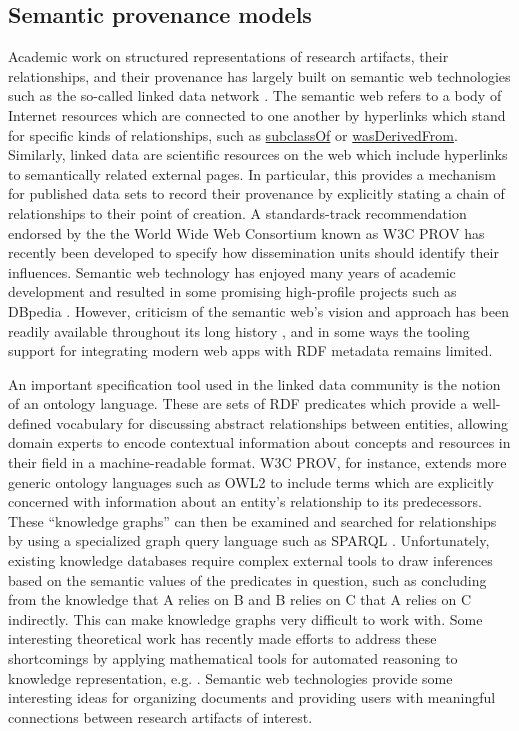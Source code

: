 \documentclass[../thesis]{subfiles}
\begin{document}
\subsection{Semantic provenance models}
Academic work on structured representations of research artifacts,
their relationships, and their provenance has largely built on
semantic web technologies such as the so-called linked data network
\cite{LinkedData}. The semantic web refers to a body
of Internet resources which are connected to one another by hyperlinks
which stand for specific kinds of relationships, such as
\href{https://www.w3.org/TR/2004/REC-rdf-schema-20040210/#ch_subclassof}{subclassOf}
or \href{https://www.w3.org/TR/2013/REC-prov-dm-20130430/#dfn-wasderivedfrom}{wasDerivedFrom}.
Similarly, linked data are scientific resources on the
web which include hyperlinks to semantically related external pages. In
particular, this provides a mechanism for published data sets to
record their provenance by explicitly stating a chain of relationships
to their point of creation. A standards-track recommendation endorsed
by the the World Wide Web Consortium known as W3C PROV \cite{PROV} has
recently been developed to specify how dissemination units should
identify their influences. Semantic web technology has enjoyed many
years of academic development and resulted in some promising
high-profile projects such as DBpedia \cite{DBpedia}. However,
criticism of the semantic web's vision and approach has been readily
available throughout its long history
\cite{Marshall:2003:SW:900051.900063}, and in some ways the tooling
support for integrating modern web apps with \gls{RDF}
metadata remains limited.

An important specification tool used in the linked data community is
the notion of an ontology language. These are sets of \gls{RDF}
predicates which provide a well-defined vocabulary for discussing
abstract relationships between entities, allowing domain experts to
encode contextual information about concepts and resources in their
field in a machine-readable format. W3C PROV, for instance, extends
more generic ontology languages such as OWL2 \cite{owl2-overview} to
include terms which are explicitly concerned with information about an
entity's relationship to its predecessors. These ``knowledge graphs''
can then be examined and searched for relationships by using a
specialized graph query language such as SPARQL \cite{SPARQL}.
Unfortunately, existing knowledge databases require complex external
tools to draw inferences based on the semantic values of the
predicates in question, such as concluding from the knowledge that A
relies on B and B relies on C that A relies on C indirectly. This can
make knowledge graphs very difficult to work with. Some interesting
theoretical work has recently made efforts to address these
shortcomings by applying mathematical tools for automated reasoning to
knowledge representation, e.g. \cite{spivak2012ologs}. Semantic web
technologies provide some interesting ideas for organizing documents
and providing users with meaningful connections between research
artifacts of interest.
\end{document}
